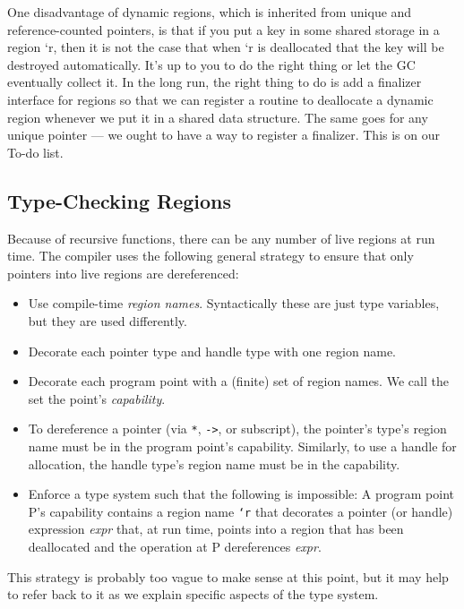One disadvantage of dynamic regions, which is inherited from unique and
reference-counted pointers, is that if you put a key in some shared storage
in a region `r, then it is not the case that when `r is deallocated that the
key will be destroyed automatically.  It's up to you to do the right thing
or let the GC eventually collect it.  In the long run, the right thing to do
is add a finalizer interface for regions so that we can register a routine
to deallocate a dynamic region whenever we put it in a shared data
structure.  The same goes for any unique pointer --- we ought to have a way
to register a finalizer.  This is on our To-do list.

\subsection{Type-Checking Regions}

Because of recursive functions, there can be any number of live
regions at run time.  The compiler uses the following general strategy to
ensure that only pointers into live regions are dereferenced:

\begin{itemize}
\item Use compile-time \emph{region names}.  Syntactically these are
  just type variables, but they are used differently.
\item Decorate each pointer type and handle type with one region name. 
\item Decorate each program point with a (finite) set of region names.
  We call the set the point's \emph{capability}.
\item To dereference a pointer (via \texttt{*}, \texttt{->}, or
  subscript), the pointer's type's region name must be in the program
  point's capability.  Similarly, to use a handle for allocation, the
  handle type's region name must be in the capability.
\item Enforce a type system such that the following is impossible: A
  program point P's capability contains a region name \texttt{`r} that
  decorates a pointer (or handle) expression \textit{expr} that, at
  run time, points into a region that has been deallocated and the
  operation at P dereferences \textit{expr}.
\end{itemize}

This strategy is probably too vague to make sense at this point, but
it may help to refer back to it as we explain specific aspects of the
type system.

